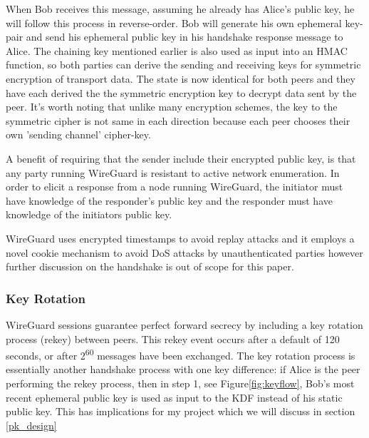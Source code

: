 \documentclass [11pt, proquest] {uwthesis}[2020/02/24]
\begin{document}
When Bob receives this message, assuming he already has Alice's public key, he will follow this process in reverse-order. Bob will generate his own ephemeral key-pair and send his ephemeral public key in his handshake response message to Alice. The chaining key mentioned earlier is also used as input into an HMAC function, so both parties can derive the sending and receiving keys for symmetric encryption of transport data.
The state is now identical for both peers and they have each derived the the symmetric encryption key to decrypt data sent by the peer. It's worth noting that unlike many encryption schemes, the key to the symmetric cipher is not same in each direction because each peer chooses their own 'sending channel' cipher-key.

A benefit of requiring that the sender include their encrypted public key, is that any party running WireGuard is resistant to active network enumeration. In order to elicit a response from a node running WireGuard, the initiator must have knowledge of the responder's public key and the responder must have knowledge of the initiators public key.

WireGuard uses encrypted timestamps to avoid replay attacks and it employs a novel cookie mechanism to avoid DoS attacks by unauthenticated parties however further discussion on the handshake is out of scope for this paper.

\subsubsection{Key Rotation}
\label{keyrotate}
WireGuard sessions guarantee perfect forward secrecy by including a key rotation process (rekey) between peers. This rekey event occurs after a default of 120 seconds, or after 2\textsuperscript{60} messages have been exchanged. The key rotation process is essentially another handshake process with one key difference: if Alice is the peer performing the rekey process, then in step 1, see Figure\ref{fig:keyflow}, Bob's most recent ephemeral public key is used as input to the KDF instead of his static public key. This has implications for my project which we will discuss in section \ref{pk_design}
\end{document}
